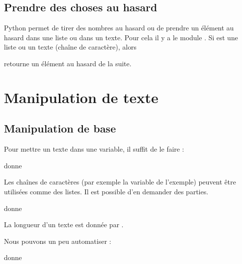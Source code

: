 


\section{Prendre des choses au hasard}


Python permet de tirer des nombres au hasard ou de prendre un élément au hasard dans une liste ou dans un texte. Pour cela il y a le module . Si  est une liste ou un texte (chaîne de caractère), alors
\begin{quote}
\end{quote}
retourne un élément au hasard de la suite.



\chapter{Manipulation de texte}

\section{Manipulation de base}

Pour mettre un texte dans une variable, il suffit de le faire :


donne


Les chaînes de caractères (par exemple la variable  de l'exemple) peuvent être utilisées comme des listes. Il est possible d'en demander des parties.


donne


La longueur d'un texte est donnée par .

Nous pouvons un peu automatiser :

donne



